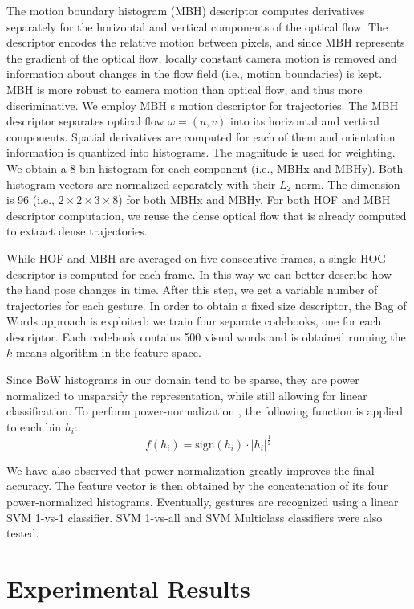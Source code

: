 The motion boundary histogram (MBH) descriptor computes derivatives separately for the horizontal and vertical components of the optical flow. The descriptor encodes the relative motion between pixels, and since MBH represents
the gradient of the optical flow, locally constant camera motion is removed and information about changes
in the flow field (i.e., motion boundaries) is kept. MBH is more robust to camera motion than optical flow,
and thus more discriminative.
We employ MBH s motion descriptor for trajectories. The MBH descriptor separates
optical flow $\omega = (u, v)$ into its horizontal and vertical components. Spatial derivatives are computed
for each of them and orientation information is quantized into histograms. The magnitude is used for
weighting. We obtain a 8-bin histogram for each component (i.e., MBHx and MBHy). Both histogram
vectors are normalized separately with their $L_2$ norm. The dimension is 96 (i.e., $2 \times 2 \times 3 \times 8$) for both
MBHx and MBHy.
For both HOF and MBH descriptor computation, we reuse the dense optical flow that is already
computed to extract dense trajectories.

While HOF and MBH are averaged on five consecutive frames, a single HOG descriptor is computed for each frame. In this way we can better describe how the hand pose changes in time. After this step, we get a variable number of trajectories for each gesture. In order to obtain a fixed size descriptor, the Bag of Words approach is exploited: we train four separate codebooks, one for each descriptor. Each codebook contains 500 visual words and is obtained running the $k$-means algorithm in the feature space. 

Since BoW histograms in our domain tend to be sparse, they are power normalized to unsparsify the representation, while still allowing for linear classification. To perform power-normalization \cite{perronnin2010improving}, the following function is applied to each bin $h_i$:
\begin{equation}
f(h_i) = \textrm{sign} (h_i) \cdot |h_i|^{\frac{1}{2}}
\end{equation}

We have also observed that power-normalization greatly improves the final accuracy. The feature vector is then obtained by the concatenation of its four power-normalized histograms. Eventually, gestures are recognized using a linear SVM 1-vs-1 classifier. SVM 1-vs-all and SVM Multiclass classifiers were also tested.

\section{Experimental Results}

